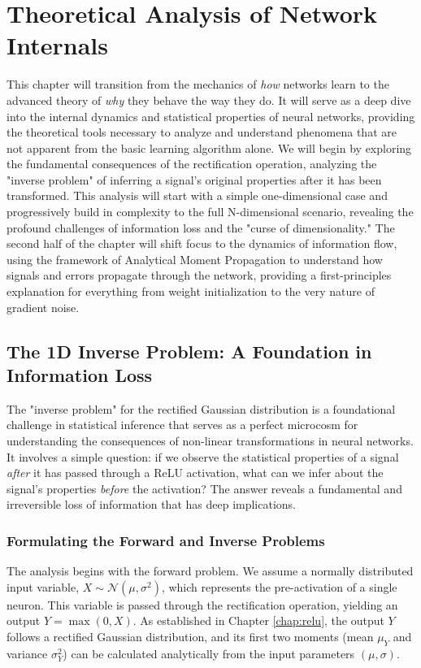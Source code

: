 \ifdefined\ispartofbook
\else
  
  
\fi

\chapter{Theoretical Analysis of Network Internals}
\label{chap:theory}

This chapter will transition from the mechanics of \textit{how} networks learn to the advanced theory of \textit{why} they behave the way they do. It will serve as a deep dive into the internal dynamics and statistical properties of neural networks, providing the theoretical tools necessary to analyze and understand phenomena that are not apparent from the basic learning algorithm alone. We will begin by exploring the fundamental consequences of the rectification operation, analyzing the "inverse problem" of inferring a signal's original properties after it has been transformed. This analysis will start with a simple one-dimensional case and progressively build in complexity to the full N-dimensional scenario, revealing the profound challenges of information loss and the "curse of dimensionality." The second half of the chapter will shift focus to the dynamics of information flow, using the framework of Analytical Moment Propagation to understand how signals and errors propagate through the network, providing a first-principles explanation for everything from weight initialization to the very nature of gradient noise.

\section{The 1D Inverse Problem: A Foundation in Information Loss}
\label{sec:inverse_1d}

The "inverse problem" for the rectified Gaussian distribution is a foundational challenge in statistical inference that serves as a perfect microcosm for understanding the consequences of non-linear transformations in neural networks. It involves a simple question: if we observe the statistical properties of a signal \textit{after} it has passed through a ReLU activation, what can we infer about the signal's properties \textit{before} the activation? The answer reveals a fundamental and irreversible loss of information that has deep implications.

\subsection{Formulating the Forward and Inverse Problems}
The analysis begins with the forward problem. We assume a normally distributed input variable, $X \sim \mathcal{N}(\mu, \sigma^2)$, which represents the pre-activation of a single neuron. This variable is passed through the rectification operation, yielding an output $Y = \max(0, X)$. As established in Chapter \ref{chap:relu}, the output $Y$ follows a rectified Gaussian distribution, and its first two moments (mean $\mu_Y$ and variance $\sigma^2_Y$) can be calculated analytically from the input parameters $(\mu, \sigma)$.

